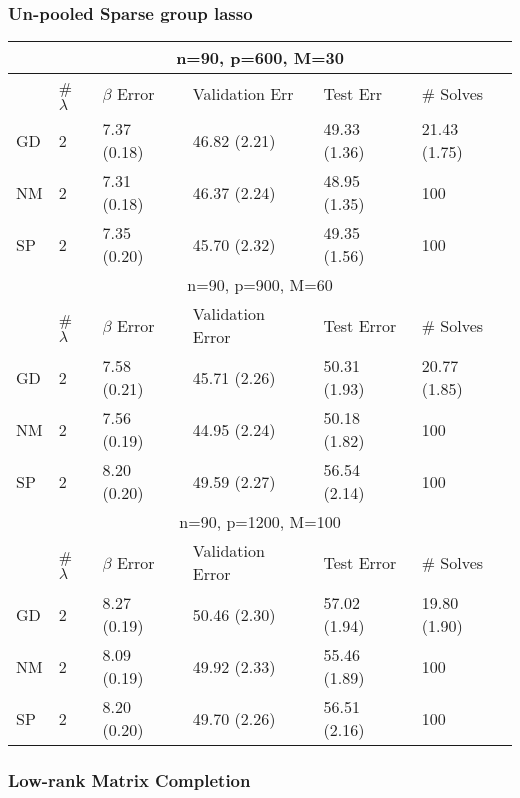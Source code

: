 \documentclass[12pt,letterpaper]{article}
\begin{document}
\subsubsection{Un-pooled Sparse group lasso}
\begin{table}
\begin{tabular}{| l | l | l | l | l | l | }
	\hline
	\multicolumn{6}{|c|}{n=90, p=600, M=30}\\
	\hline
	& \# $\lambda$ & $\beta$ Error & Validation Err & Test Err & \# Solves \\
	\hline
	GD & 2 & 7.37 (0.18) & 46.82 (2.21) & 49.33 (1.36)& 21.43 (1.75)\\
	\hline
	NM & 2 & 7.31 (0.18)  & 46.37 (2.24) & 48.95 (1.35) & 100 \\
	\hline
	SP & 2 & 7.35 (0.20) &  45.70 (2.32) & 49.35 (1.56) & 100 \\
	\hline
	\multicolumn{6}{|c|}{n=90, p=900, M=60}\\
	\hline
	& \# $\lambda$ & $\beta$ Error & Validation Error & Test Error & \# Solves \\
	\hline
	GD & 2 & 7.58 (0.21) & 45.71 (2.26) & 50.31 (1.93) & 20.77 (1.85)  \\
	\hline
	NM & 2 & 7.56 (0.19) & 44.95 (2.24) & 50.18 (1.82) & 100  \\
	\hline
	SP & 2 & 8.20 (0.20)  & 49.59 (2.27) & 56.54 (2.14) & 100 \\
	\hline
	\multicolumn{6}{|c|}{n=90, p=1200, M=100}\\
	\hline
	& \# $\lambda$ & $\beta$ Error & Validation Error & Test Error & \# Solves \\
	\hline
	GD & 2 & 8.27 (0.19) & 50.46 (2.30) & 57.02 (1.94) & 19.80 (1.90) \\
	\hline
	NM & 2 & 8.09 (0.19) & 49.92 (2.33) & 55.46 (1.89) & 100 \\
	\hline
	SP & 2 & 8.20 (0.20) & 49.70 (2.26) & 56.51 (2.16) & 100 \\
	\hline
\end{tabular}
\end{table}

\subsubsection{Low-rank Matrix Completion}
\end{document}
